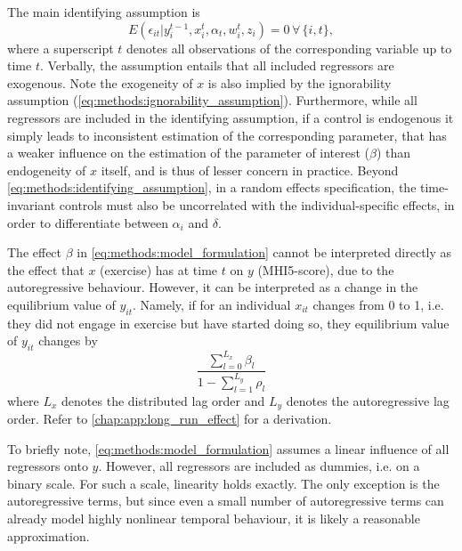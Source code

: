 The main identifying assumption is \cite{moral2019dynamic}
\begin{equation}
    \label{eq:methods:identifying_assumption}
    E(\epsilon_{it} | y_i^{t-1}, x_i^t, \alpha_t, w_{i}^t, z_i) = 0 \,\forall\,\{i,t\},
\end{equation}
where a superscript $t$ denotes all observations of the corresponding variable up to time $t$.
Verbally, the assumption entails that all included regressors are exogenous.
Note the exogeneity of $x$ is also implied by the ignorability assumption (\cref{eq:methods:ignorability_assumption}).
Furthermore, while all regressors are included in the identifying assumption, if a control is endogenous it simply
leads to inconsistent estimation of the corresponding parameter, that has a weaker influence on the estimation
of the parameter of interest ($\beta$) than endogeneity of $x$ itself, and is thus of lesser concern in practice.
Beyond \cref{eq:methods:identifying_assumption}, in a random effects specification, the time-invariant controls
must also be uncorrelated with the individual-specific effects, in order to differentiate between $\alpha_i$ and $\delta$.

The effect $\beta$ in \cref{eq:methods:model_formulation} cannot be interpreted directly as the effect that $x$ (exercise)
has at time $t$ on $y$ (MHI5-score), due to the autoregressive behaviour. However, it can be interpreted as a change
in the equilibrium value of $y_{it}$. Namely, if for an individual $x_{it}$ changes from 0 to 1, i.e. they did not
engage in exercise but have started doing so, they equilibrium value of $y_{it}$ changes by
\begin{equation}
    \label{eq:methods:long_run_effect}
    \frac{\sum_{l=0}^{L_x} \beta_l}{1 - \sum_{l=1}^{L_y} \rho_l}
\end{equation}
where $L_x$ denotes the distributed lag order and $L_y$ denotes the autoregressive lag order.
Refer to \cref{chap:app:long_run_effect} for a derivation.

To briefly note, \cref{eq:methods:model_formulation} assumes a linear influence of all regressors onto $y$. However, all regressors
are included as dummies, i.e. on a binary scale. For such a scale, linearity holds exactly.
The only exception is the autoregressive terms, but since even a small number of autoregressive terms can already
model highly nonlinear temporal behaviour, it is likely a reasonable approximation.

